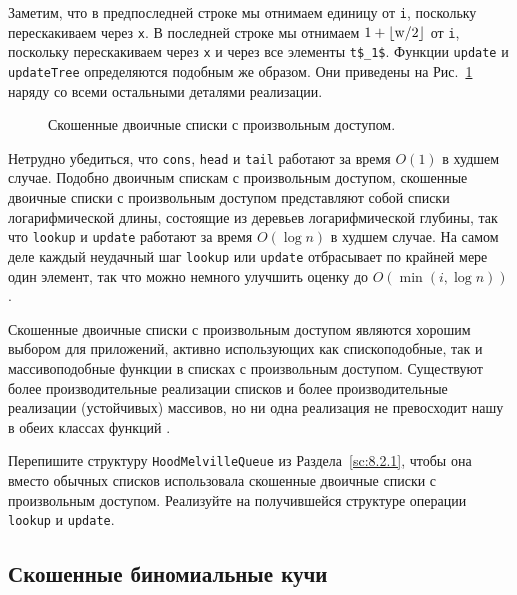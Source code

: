 Заметим, что в предпоследней строке мы отнимаем единицу от \lstinline!i!,
поскольку перескакиваем через \lstinline!x!. В последней строке мы
отнимаем $1 + \lfloor \lstinline!w!/2 \rfloor$ от \lstinline!i!,
поскольку перескакиваем через \lstinline!x! и через все элементы
\lstinline!t$_1$!. Функции \lstinline!update! и \lstinline!updateTree!
определяются подобным же образом. Они приведены на Рис.~\ref{fig:9.7}
наряду со всеми остальными деталями реализации.

\begin{figure}
  \centering

  \caption{Скошенные двоичные списки с произвольным доступом.}
  \label{fig:9.7}
\end{figure}

Нетрудно убедиться, что \lstinline!cons!, \lstinline!head! и
\lstinline!tail! работают за время $O(1)$ в худшем случае. Подобно
двоичным спискам с произвольным доступом, скошенные двоичные списки с
произвольным доступом представляют собой списки логарифмической длины,
состоящие из деревьев логарифмической глубины, так что
\lstinline!lookup! и \lstinline!update! работают за время $O(\log n)$
в худшем случае. На самом деле каждый неудачный шаг \lstinline!lookup!
или \lstinline!update! отбрасывает по крайней мере один элемент, так
что можно немного улучшить оценку до $O(\min(i, \log n))$.

\begin{hint}
  Скошенные двоичные списки с произвольным доступом являются хорошим
  выбором для приложений, активно использующих как спископодобные, так
  и массивоподобные функции в списках с произвольным
  доступом. Существуют более производительные реализации списков и
  более производительные реализации (устойчивых) массивов, но ни одна
  реализация не превосходит нашу в обеих классах функций \cite{Okasaki1995b}.
\end{hint}

\begin{exercise}\label{ex:9.14}
  Перепишите структуру \lstinline!HoodMelvilleQueue! из
  Раздела~\ref{sc:8.2.1}, чтобы она вместо обычных списков
  использовала скошенные двоичные списки с произвольным
  доступом. Реализуйте на получившейся структуре операции
  \lstinline!lookup! и \lstinline!update!.
\end{exercise}

\subsection{Скошенные биномиальные кучи}
\label{sc:9.3.2}

